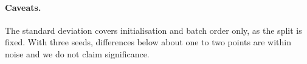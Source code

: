 \begin{table}[t]\centering\small
\caption{CIFAR-100-LT, imbalance 100. Test accuracy (\%), mean $\pm$ std over 3 seeds; bold = best mean.}\label{tab:cifar100-main}
\end{table}
\begin{table}[t]\centering\small
\caption{CIFAR-100-LT: paired difference against ERM of the same seed (percentage points).}\label{tab:cifar100-paired}
\end{table}
\paragraph{Caveats.} The standard deviation covers initialisation and batch order only, as the split is fixed.
With three seeds, differences below about one to two points are within noise and we do not claim significance.

